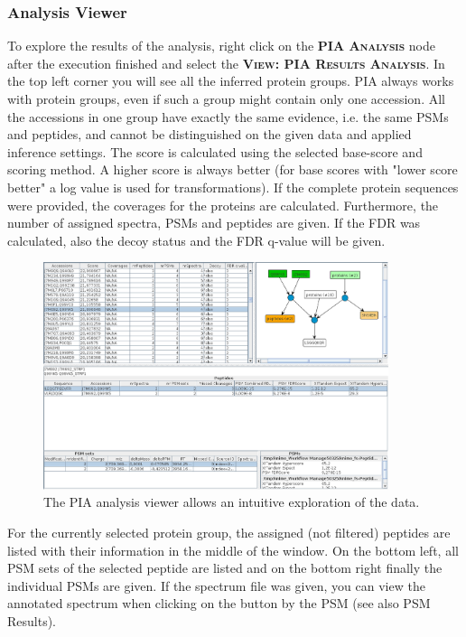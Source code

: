 \documentclass[a4paper,11pt,twoside]{article}
\newcommand{\menu}[1]{{\scshape\bfseries #1}}
\newcommand{\knimenode}[1]{{\scshape\bfseries #1}}
\begin{document}
\subsubsection{Analysis Viewer}

To explore the results of the analysis, right click on the \knimenode{PIA
Analysis} node after the execution finished and select the \menu{View: PIA
Results Analysis}. In the top left corner you will see all the inferred protein
groups. PIA always works with protein groups, even if such a group might
contain only one accession. All the accessions in one group have exactly the
same evidence, i.e. the same PSMs and peptides, and cannot be distinguished on
the given data and applied inference settings. The score is calculated using
the selected base-score and scoring method.  A higher score is always better
(for base scores with "lower score better" a log value is used for
transformations). If the complete protein sequences were provided, the
coverages for the proteins are calculated. Furthermore, the number of assigned
spectra, PSMs and peptides are given. If the FDR was calculated, also the decoy
status and the FDR q-value will be given.

\begin{figure}[ht!]
	\centering
	\includegraphics[width=0.9\textwidth]{graphics/screenshot_PIA_analysis}
	\caption{The PIA analysis viewer allows an intuitive exploration of the
	data.}
	\label{pia_analysis}
\end{figure}

For the currently selected protein group, the assigned (not filtered) peptides
are listed with their information in the middle of the window. On the bottom
left, all PSM sets of the selected peptide are listed and on the bottom right
finally the individual PSMs are given. If the spectrum file was given, you can
view the annotated spectrum when clicking on the button by the PSM (see also
PSM Results).
\end{document}
